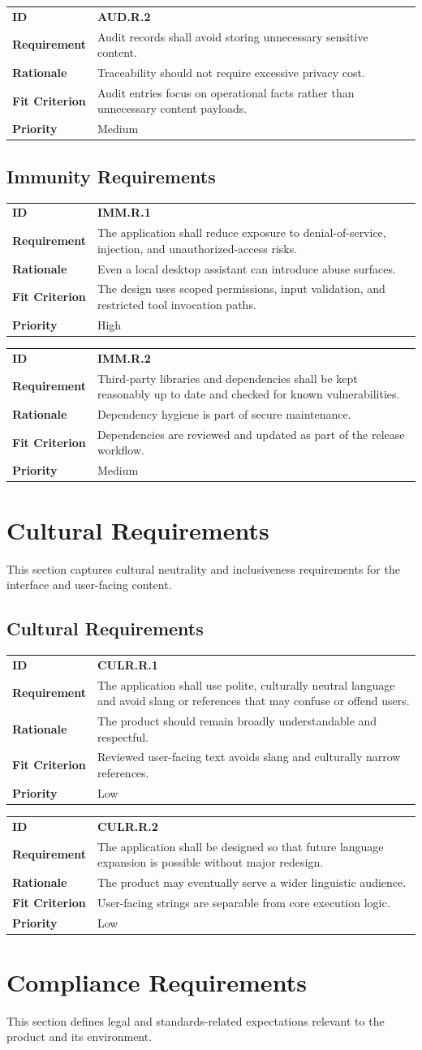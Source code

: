 \documentclass[12pt]{article}
\makeatletter
\newcommand{\reqcard}[5]{%
\noindent\begin{tabularx}{\textwidth}{@{}p{2.35cm}X@{}}
\textbf{ID} & \textbf{#1} \\
\textbf{Requirement} & #2 \\
\textbf{Rationale} & #3 \\
\textbf{Fit Criterion} & #4 \\
\textbf{Priority} & #5 \\
\end{tabularx}\par\medskip
}
\makeatother
\begin{document}
\reqcard{AUD.R.2}{Audit records shall avoid storing unnecessary
sensitive content.}{Traceability should not require excessive privacy
cost.}{Audit entries focus on operational facts rather than
unnecessary content payloads.}{Medium}

\subsection{Immunity Requirements}
\reqcard{IMM.R.1}{The application shall reduce exposure to
denial-of-service, injection, and unauthorized-access risks.}{Even a
local desktop assistant can introduce abuse surfaces.}{The design uses
scoped permissions, input validation, and restricted tool invocation
paths.}{High}

\reqcard{IMM.R.2}{Third-party libraries and dependencies shall be kept
reasonably up to date and checked for known vulnerabilities.}{Dependency
hygiene is part of secure maintenance.}{Dependencies are reviewed and
updated as part of the release workflow.}{Medium}

\section{Cultural Requirements}
This section captures cultural neutrality and inclusiveness
requirements for the interface and user-facing content.

\subsection{Cultural Requirements}
\reqcard{CULR.R.1}{The application shall use polite, culturally
neutral language and avoid slang or references that may confuse or
offend users.}{The product should remain broadly understandable and
respectful.}{Reviewed user-facing text avoids slang and culturally
narrow references.}{Low}

\reqcard{CULR.R.2}{The application shall be designed so that future
language expansion is possible without major redesign.}{The product
may eventually serve a wider linguistic audience.}{User-facing strings
are separable from core execution logic.}{Low}

\section{Compliance Requirements}
This section defines legal and standards-related expectations relevant
to the product and its environment.
\end{document}
